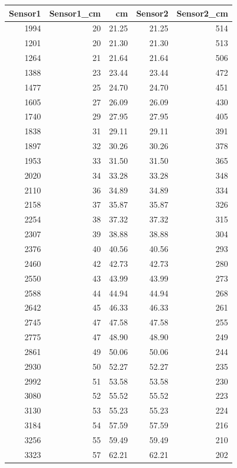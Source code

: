 \documentclass[
]{article}
\begin{document}
\begin{table}
\centering
\begin{tabular}{r|r|r|r|r}
\hline
Sensor1 & Sensor1\_cm & cm & Sensor2 & Sensor2\_cm\\
\hline
1994 & 20 & 21.25 & 21.25 & 514\\
\hline
1201 & 20 & 21.30 & 21.30 & 513\\
\hline
1264 & 21 & 21.64 & 21.64 & 506\\
\hline
1388 & 23 & 23.44 & 23.44 & 472\\
\hline
1477 & 25 & 24.70 & 24.70 & 451\\
\hline
1605 & 27 & 26.09 & 26.09 & 430\\
\hline
1740 & 29 & 27.95 & 27.95 & 405\\
\hline
1838 & 31 & 29.11 & 29.11 & 391\\
\hline
1897 & 32 & 30.26 & 30.26 & 378\\
\hline
1953 & 33 & 31.50 & 31.50 & 365\\
\hline
2020 & 34 & 33.28 & 33.28 & 348\\
\hline
2110 & 36 & 34.89 & 34.89 & 334\\
\hline
2158 & 37 & 35.87 & 35.87 & 326\\
\hline
2254 & 38 & 37.32 & 37.32 & 315\\
\hline
2307 & 39 & 38.88 & 38.88 & 304\\
\hline
2376 & 40 & 40.56 & 40.56 & 293\\
\hline
2460 & 42 & 42.73 & 42.73 & 280\\
\hline
2550 & 43 & 43.99 & 43.99 & 273\\
\hline
2588 & 44 & 44.94 & 44.94 & 268\\
\hline
2642 & 45 & 46.33 & 46.33 & 261\\
\hline
2745 & 47 & 47.58 & 47.58 & 255\\
\hline
2775 & 47 & 48.90 & 48.90 & 249\\
\hline
2861 & 49 & 50.06 & 50.06 & 244\\
\hline
2930 & 50 & 52.27 & 52.27 & 235\\
\hline
2992 & 51 & 53.58 & 53.58 & 230\\
\hline
3080 & 52 & 55.52 & 55.52 & 223\\
\hline
3130 & 53 & 55.23 & 55.23 & 224\\
\hline
3184 & 54 & 57.59 & 57.59 & 216\\
\hline
3256 & 55 & 59.49 & 59.49 & 210\\
\hline
3323 & 57 & 62.21 & 62.21 & 202\\

\end{tabular}
\end{table}
\end{document}
